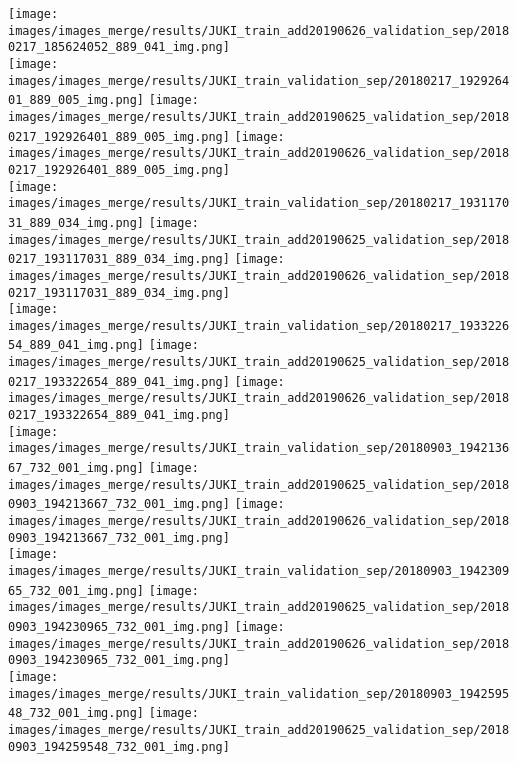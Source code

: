 \begin{center}
\texttt{[image: images/images\_merge/results/JUKI\_train\_add20190626\_validation\_sep/20180217\_185624052\_889\_041\_img.png]}\\
\texttt{[image: images/images\_merge/results/JUKI\_train\_validation\_sep/20180217\_192926401\_889\_005\_img.png]}
\texttt{[image: images/images\_merge/results/JUKI\_train\_add20190625\_validation\_sep/20180217\_192926401\_889\_005\_img.png]}
\texttt{[image: images/images\_merge/results/JUKI\_train\_add20190626\_validation\_sep/20180217\_192926401\_889\_005\_img.png]}\\
\texttt{[image: images/images\_merge/results/JUKI\_train\_validation\_sep/20180217\_193117031\_889\_034\_img.png]}
\texttt{[image: images/images\_merge/results/JUKI\_train\_add20190625\_validation\_sep/20180217\_193117031\_889\_034\_img.png]}
\texttt{[image: images/images\_merge/results/JUKI\_train\_add20190626\_validation\_sep/20180217\_193117031\_889\_034\_img.png]}\\
\texttt{[image: images/images\_merge/results/JUKI\_train\_validation\_sep/20180217\_193322654\_889\_041\_img.png]}
\texttt{[image: images/images\_merge/results/JUKI\_train\_add20190625\_validation\_sep/20180217\_193322654\_889\_041\_img.png]}
\texttt{[image: images/images\_merge/results/JUKI\_train\_add20190626\_validation\_sep/20180217\_193322654\_889\_041\_img.png]}\\
\texttt{[image: images/images\_merge/results/JUKI\_train\_validation\_sep/20180903\_194213667\_732\_001\_img.png]}
\texttt{[image: images/images\_merge/results/JUKI\_train\_add20190625\_validation\_sep/20180903\_194213667\_732\_001\_img.png]}
\texttt{[image: images/images\_merge/results/JUKI\_train\_add20190626\_validation\_sep/20180903\_194213667\_732\_001\_img.png]}\\
\texttt{[image: images/images\_merge/results/JUKI\_train\_validation\_sep/20180903\_194230965\_732\_001\_img.png]}
\texttt{[image: images/images\_merge/results/JUKI\_train\_add20190625\_validation\_sep/20180903\_194230965\_732\_001\_img.png]}
\texttt{[image: images/images\_merge/results/JUKI\_train\_add20190626\_validation\_sep/20180903\_194230965\_732\_001\_img.png]}\\
\texttt{[image: images/images\_merge/results/JUKI\_train\_validation\_sep/20180903\_194259548\_732\_001\_img.png]}
\texttt{[image: images/images\_merge/results/JUKI\_train\_add20190625\_validation\_sep/20180903\_194259548\_732\_001\_img.png]}

\end{center}
